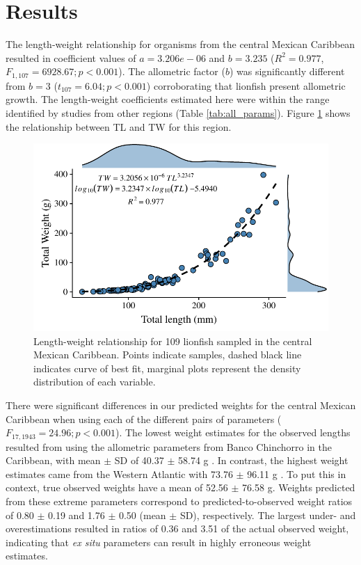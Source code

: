 \documentclass[fleqn,10pt,lineno]{wlpeerj} %
\begin{document}
\section*{Results}

The length-weight relationship for organisms from the central Mexican
Caribbean resulted in coefficient values of \(a = 3.206e-06\) and
\(b = 3.235\) (\(R^2 = 0.977\), \(F_{1, 107} = 6928.67; p < 0.001\)).
The allometric factor (\(b\)) was significantly different from \(b = 3\)
(\(t_{107} = 6.04; p<0.001\)) corroborating that lionfish present
allometric growth. The length-weight coefficients estimated here were
within the range identified by studies from other regions (Table
\ref{tab:all_params}). Figure \ref{fig:l-w-carib} shows the relationship
between TL and TW for this region.

\begin{figure}
\centering
\includegraphics{Manuscript_files/figure-latex/fit1-1.pdf}
\caption{\label{fig:l-w-carib}Length-weight relationship for 109
lionfish sampled in the central Mexican Caribbean. Points indicate
samples, dashed black line indicates curve of best fit, marginal plots
represent the density distribution of each variable.}
\end{figure}

There were significant differences in our predicted weights for the
central Mexican Caribbean when using each of the different pairs of
parameters (\(F_{17, 1943} = 24.96; p < 0.001\)). The lowest weight
estimates for the observed lengths resulted from using the allometric
parameters from Banco Chinchorro in the Caribbean, with mean \(\pm\) SD
of 40.37 \(\pm\) 58.74 g \citep{sabidoitz_2016}. In contrast, the
highest weight estimates came from the Western Atlantic with 73.76
\(\pm\) 96.11 g \citep{barbour_2011}. To put this in context, true
observed weights have a mean of 52.56 \(\pm\) 76.58 g. Weights predicted
from these extreme parameters correspond to predicted-to-observed weight
ratios of 0.80 \(\pm\) 0.19 and 1.76 \(\pm\) 0.50 (mean \(\pm\) SD),
respectively. The largest under- and overestimations resulted in ratios
of 0.36 and 3.51 of the actual observed weight, indicating that \emph{ex
situ} parameters can result in highly erroneous weight estimates.
\end{document}

